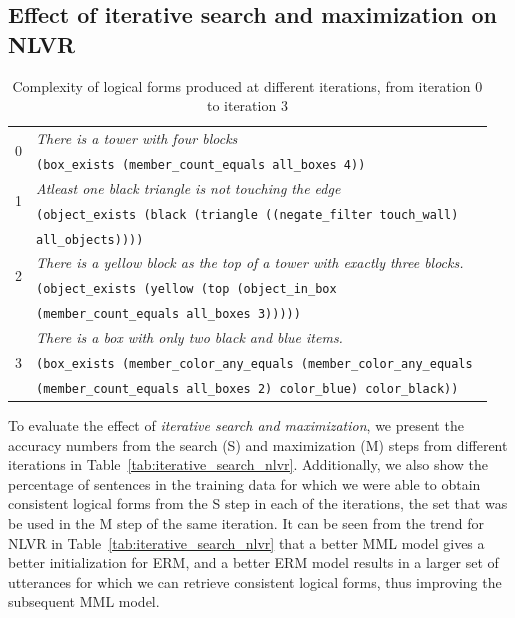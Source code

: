 \subsection{Effect of iterative search and maximization on NLVR} \label{sec:results_iterative}
\begin{table}
	\centering
	\begin{tabular}{cl}
	\multirow{2}{*}{0} & \textit{There is a tower with four blocks}\\
	& \texttt{(box\_exists (member\_count\_equals all\_boxes 4))}\\
	\multirow{2}{*}{1} & \textit{Atleast one black triangle is not touching the edge}\\
	& \texttt{(object\_exists (black (triangle ((negate\_filter touch\_wall)} \\
	& \texttt{all\_objects))))}\\
	\multirow{2}{*}{2} & \textit{There is a yellow block as the top of a tower with exactly three blocks.} \\
	& \texttt{(object\_exists (yellow (top (object\_in\_box} \\
	& \texttt{(member\_count\_equals all\_boxes 3)))))}\\
	\multirow{3}{*}{3} & \textit{There is a box with only two black and blue items.} \\
	& \texttt{(box\_exists (member\_color\_any\_equals (member\_color\_any\_equals }\\
	& \texttt{(member\_count\_equals all\_boxes 2) color\_blue) color\_black))}\\ 
	\end{tabular}
	\caption{Complexity of logical forms produced at different iterations, from iteration 0 to iteration 3}\label{tab:logical_form_complexity}
\end{table}
To evaluate the effect of \textit{iterative search and maximization}, we present
the accuracy numbers from the search (S) and maximization (M) steps from
different iterations in Table~\ref{tab:iterative_search_nlvr}. Additionally, we
also show the percentage of sentences in the training data for which we were
able to obtain consistent logical forms from the S step in each of the
iterations, the set that was be used in the M step of the same iteration. It can
be seen from the trend for NLVR in Table~\ref{tab:iterative_search_nlvr} that a
better MML model gives a better initialization for ERM, and a better ERM model
results in a larger set of utterances for which we can retrieve consistent
logical forms, thus improving the subsequent MML model.

